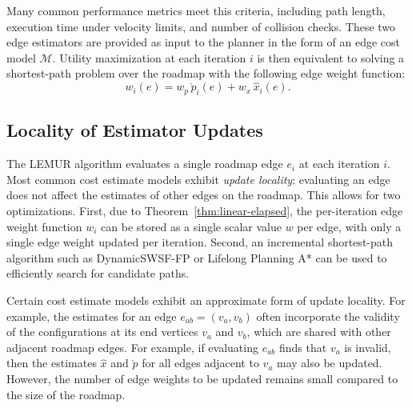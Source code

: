 Many common performance metrics meet this criteria,
including path length, execution time under velocity limits,
and number of collision checks.
These two edge estimators are provided as input to the planner
in the form of an edge cost model $\mathcal{M}$.
Utility maximization at each iteration $i$ is then
equivalent to solving
a shortest-path problem over the roadmap with the following
edge weight function:
\begin{equation}
   w_i(e) = w_p \, \grave{p}_i(e) + w_x \, \hat{x}_i(e).
   \label{eqn:edge-weight}
\end{equation}

\subsection{Locality of Estimator Updates}

The LEMUR algorithm evaluates a single roadmap edge $e_i$
at each iteration $i$.
Most common cost estimate models exhibit \emph{update locality}:
evaluating an edge does not affect the estimates of other edges
on the roadmap.
This allows for two optimizations.
First,
due to Theorem~\ref{thm:linear-elapsed},
the per-iteration edge weight function $w_i$
can be stored as a single scalar value $w$ per edge,
with only a single edge weight updated per iteration.
Second,
an incremental shortest-path algorithm
such as DynamicSWSF-FP \citep{ramalingam1996}
or Lifelong Planning A* \citep{koenig2004lpastar}
can be used to efficiently search for candidate paths.

Certain cost estimate models exhibit an approximate form of
update locality.
For example, the estimates for an edge $e_{ab} = (v_a, v_b)$
often incorporate the validity of the configurations
at its end vertices $v_a$ and $v_b$,
which are shared with other adjacent roadmap edges.
For example, if evaluating $e_{ab}$ finds that $v_a$ is invalid,
then the estimates $\hat{x}$ and $\grave{p}$ for all edges
adjacent to $v_a$ may also be updated.
However,
the number of edge weights to be updated remains small
compared to the size of the roadmap.

